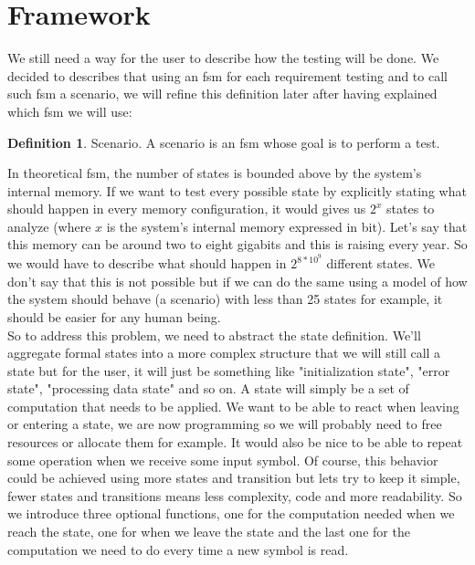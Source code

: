 \documentclass[12pt]{article}
\theoremstyle{definition}
\newtheorem{definition}{Definition}[section]
\theoremstyle{definition}
\theoremstyle{remark}
\begin{document}



\section{Framework}


We still need a way for the user to describe how the testing will be done. We decided to describes that using an \gls{fsm} for each requirement testing and to call such \gls{fsm} a scenario, we will refine this definition later after having explained which \gls{fsm} we will use:

\theoremstyle{definition}
\begin{definition}{Scenario.} A scenario is an \gls{fsm} whose goal is to perform a test.
\end{definition}

In theoretical \gls{fsm}, the number of states is bounded above by the system's internal memory. If we want to test every possible state by explicitly stating what should happen in every memory configuration, it would gives us $2^x$ states to analyze (where $x$ is the system's internal memory expressed in bit). Let's say that this memory can be around two to eight gigabits and this is raising every year. So we would have to describe what should happen in $2^{8*10^9}$ different states. We don't say that this is not possible but if we can do the same using a model of how the system should behave (a scenario) with less than 25 states for example, it should be easier for any human being.\\

So to address this problem, we need to abstract the state definition. We'll aggregate formal states into a more complex structure that we will still call a state but for the user, it will just be something like "initialization state", "error state", "processing data state" and so on. A state will simply be a set of computation that needs to be applied.
We want to be able to react when leaving or entering a state, we are now programming so we will probably need to free resources or allocate them for example. It would also be nice to be able to repeat some operation when we receive some input symbol. Of course, this behavior could be achieved using more states and transition but lets try to keep it simple, fewer states and transitions means less complexity, code and more readability. So we introduce three optional functions, one for the computation needed when we reach the state, one for when we leave the state and the last one for the computation we need to do every time a new symbol is read.\\
\end{document}
